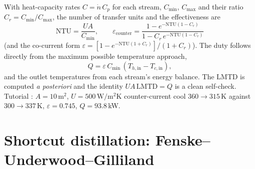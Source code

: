 \documentclass[11pt,a4paper]{article}
\begin{document}
With heat-capacity rates $C = \dot n\,C_p$ for each stream, $C_{\min}$,
$C_{\max}$ and their ratio $C_r=C_{\min}/C_{\max}$, the number of
transfer units and the effectiveness are
\begin{equation}
   \mathrm{NTU} = \frac{U A}{C_{\min}}, \qquad
   \varepsilon_{\text{counter}} = \frac{1 - e^{-\mathrm{NTU}(1-C_r)}}
                                       {1 - C_r\,e^{-\mathrm{NTU}(1-C_r)}}
\end{equation}
(and the co-current form $\varepsilon = [1-e^{-\mathrm{NTU}(1+C_r)}]/(1+C_r)$).
The duty follows directly from the maximum possible temperature
approach,
\begin{equation}
   Q = \varepsilon\,C_{\min}\,(T_{h,\text{in}} - T_{c,\text{in}}),
\end{equation}
and the outlet temperatures from each stream's energy balance.  The
LMTD is computed \emph{a posteriori} and the identity $U A\,\text{LMTD}
= Q$ is a clean self-check.  Tutorial :
$A=10\,\mathrm{m^2}$, $U=500\,\mathrm{W/m^2K}$ counter-current cool
$360\to315$\,K against $300\to337$\,K, $\varepsilon=0.745$, $Q=93.8$\,kW.

\section{Shortcut distillation: Fenske--Underwood--Gilliland}\label{ch:fug}
\end{document}

